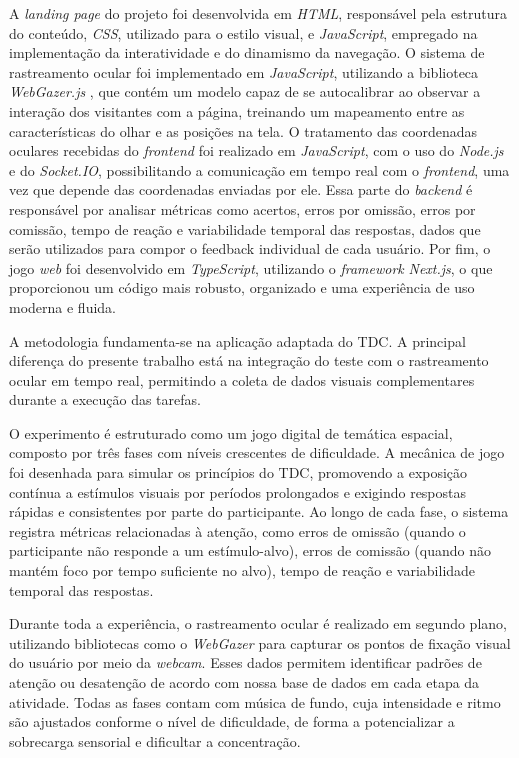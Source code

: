 A \textit{landing page} do projeto foi desenvolvida em \textit{HTML}, responsável pela estrutura do conteúdo, \textit{CSS}, utilizado para o estilo visual, e \textit{JavaScript}, empregado na implementação da interatividade e do dinamismo da navegação. O sistema de rastreamento ocular foi implementado em \textit{JavaScript}, utilizando a biblioteca \textit{WebGazer.js} \cite{papoutsaki2016webgazer}, que contém um modelo capaz de se autocalibrar ao observar a interação dos visitantes com a página, treinando um mapeamento entre as características do olhar e as posições na tela. O tratamento das coordenadas oculares recebidas do \textit{frontend} foi realizado em \textit{JavaScript}, com o uso do \textit{Node.js} e do \textit{Socket.IO}, possibilitando a comunicação em tempo real com o \textit{frontend}, uma vez que depende das coordenadas enviadas por ele. Essa parte do \textit{backend} é responsável por analisar métricas como acertos, erros por omissão, erros por comissão, tempo de reação e variabilidade temporal das respostas, dados que serão utilizados para compor o feedback individual de cada usuário. Por fim, o jogo \textit{web} foi desenvolvido em \textit{TypeScript}, utilizando o \textit{framework} \textit{Next.js}, o que proporcionou um código mais robusto, organizado e uma experiência de uso moderna e fluida.

A metodologia fundamenta-se na aplicação adaptada do TDC. A principal diferença do presente trabalho está na integração do teste com o rastreamento ocular em tempo real, permitindo a coleta de dados visuais complementares durante a execução das tarefas.

O experimento é estruturado como um jogo digital de temática espacial, composto por
três fases com níveis crescentes de dificuldade. A mecânica de jogo foi desenhada para simular os
princípios do TDC, promovendo a exposição contínua a estímulos visuais por períodos prolongados e exigindo respostas rápidas e consistentes por parte do participante. Ao longo de cada fase, o sistema registra métricas relacionadas à atenção, como erros de omissão (quando o participante não responde a um estímulo-alvo), erros de comissão (quando não mantém foco por tempo suficiente no alvo), tempo de reação e variabilidade temporal das respostas.

Durante toda a experiência, o rastreamento ocular é realizado em segundo plano, utilizando
bibliotecas como o \textit{WebGazer} para capturar os pontos de fixação visual do usuário por meio da \textit{webcam}. Esses dados permitem identificar padrões de atenção ou desatenção de acordo com nossa base de dados em cada etapa da atividade. Todas as fases contam com música de fundo, cuja intensidade e ritmo são ajustados conforme o nível de dificuldade, de forma a potencializar a sobrecarga sensorial e dificultar a concentração.

